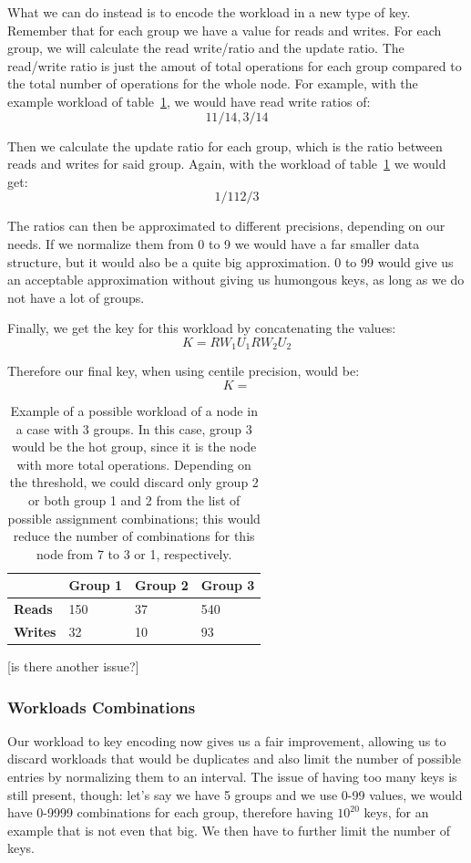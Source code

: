 What we can do instead is to encode the workload in a new type of key. Remember that for each group we have a value for reads and writes. For each group, we will calculate the read write/ratio and the update ratio. The read/write ratio is just the amout of total operations for each group compared to the total number of operations for the whole node. For example, with the example workload of table~\ref{tab:workload-example}, we would have read write ratios of:
$$ 11/14, 3/14 $$

Then we calculate the update ratio for each group, which is the ratio between reads and writes for said group. Again, with the workload of table~\ref{tab:workload-example} we would get:
$$1/11 2/3 $$

The ratios can then be approximated to different precisions, depending on our needs. If we normalize them from 0 to 9 we would have a far smaller data structure, but it would also be a quite big approximation. 0 to 99 would give us an acceptable approximation without giving us humongous keys, as long as we do not have a lot of groups. 

Finally, we get the key for this workload by concatenating the values:
$$ K = RW_1 U_1 RW_2 U_2 $$

Therefore our final key, when using centile precision, would be:
$$ K = $$

\begin{table}[!htb]
  \centering
  \begin{tabular}{l l l l}
    \hline
    & \textbf{Group 1} & \textbf{Group 2} & \textbf{Group 3} \\
    \hline
    \textbf{Reads} & 150 & 37 & 540 \\
    \textbf{Writes} & 32 & 10 & 93 \\
    \hline
  \end{tabular}
  \caption{Example of a possible workload of a node in a case with 3 groups. In this case, group 3 would be the hot group, since it is the node with more total operations. Depending on the threshold, we could discard only group 2 or both group 1 and 2 from the list of possible assignment combinations; this would reduce the number of combinations for this node from 7 to 3 or 1, respectively.}\label{tab:workload-example}
\end{table}


[is there another issue?]

\subsubsection{Workloads Combinations}\label{sec:Workloads-combinations}
Our workload to key encoding now gives us a fair improvement, allowing us to discard workloads that would be duplicates and also limit the number of possible entries by normalizing them to an interval. The issue of having too many keys is still present, though: let's say we have 5 groups and we use 0-99 values, we would have 0-9999 combinations for each group, therefore having $10^{20}$ keys, for an example that is not even that big. We then have to further limit the number of keys. 

